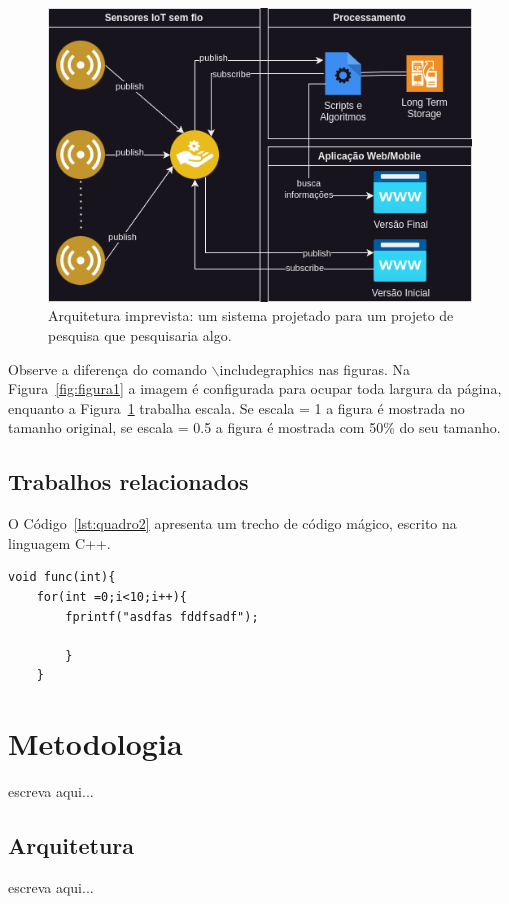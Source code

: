\begin{figure}[htb]
	\centering
	\caption{\label{fig:figura2} Arquitetura imprevista: um sistema projetado para um projeto de pesquisa que pesquisaria algo.}
	\includegraphics[scale=0.5]{imgs/arquitetura.png}
\end{figure}

Observe a diferença do comando $\backslash$includegraphics nas figuras. Na Figura~\ref{fig:figura1} a imagem é configurada para ocupar toda largura da página, enquanto a Figura~\ref{fig:figura2} trabalha escala. Se escala = 1 a figura é mostrada no tamanho original, se escala = 0.5 a figura é mostrada com 50\% do seu tamanho. 

\section{\label{sec:trabRelacionados}Trabalhos relacionados}

O Código~\ref{lst:quadro2} apresenta um trecho de código mágico, escrito na linguagem C++.

\begin{lstlisting}[caption={Exemplo de laço},label={lst:quadro2}]
	void func(int){
	for(int =0;i<10;i++){
		fprintf("asdfas fddfsadf");
	
		}
	}
\end{lstlisting}


\chapter{\label{ch:metodo}Metodologia}
escreva aqui...

\section{\label{sec:arch}Arquitetura}
escreva aqui...

